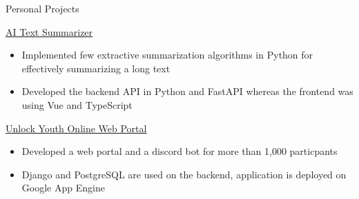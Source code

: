 \documentclass{article}
\newlength{\tabin}
\newlength{\secsep}
\newcommand{\lineunder}{\vspace*{-8pt} \\ \hspace*{-6pt} \hrulefill \\ \vspace*{-15pt}}
\newenvironment{tabbedsection}[1]{
  \begin{list}{}{
      \setlength{\itemsep}{0pt}
      \setlength{\labelsep}{0pt}
      \setlength{\labelwidth}{0pt}
      \setlength{\leftmargin}{\tabin}
      \setlength{\rightmargin}{\tabin}
      \setlength{\listparindent}{0pt}
      \setlength{\parsep}{0pt}
      \setlength{\parskip}{0pt}
      \setlength{\partopsep}{0pt}
      \setlength{\topsep}{#1}
    }
  \item[]
}{\end{list}}
\newenvironment{resume_section}[1]{
  \filbreak
  \vspace{2\secsep}
  \textsc{\large#1}
  \lineunder
  \begin{tabbedsection}{\secsep}
}{\end{tabbedsection}}
\newenvironment{resume_subsection}[2][]{
  \textbf{#2} \hfill {\footnotesize #1} \hspace{2em}
  \begin{tabbedsection}{0.5\secsep}
}{\end{tabbedsection}}
\newenvironment{subitems}{
  \renewcommand{\labelitemi}{-}
  \begin{itemize}
      \setlength{\labelsep}{1em}
}{\end{itemize}}
\begin{document}
\begin{resume_section}{Personal Projects}

  \begin{resume_subsection}{\href{https://github.com/marcustut/summarize}{AI Text Summarizer}}
    \begin{subitems}
      \item Implemented few extractive summarization algorithms in Python for effectively summarizing a long text
      \item Developed the backend API in Python and FastAPI whereas the frontend was using Vue and TypeScript
    \end{subitems}
  \end{resume_subsection}


  \begin{resume_subsection}{\href{https://github.com/marcustut/UnlockProject}{Unlock Youth Online Web Portal}}
    \begin{subitems}
      \item Developed a web portal and a discord bot for more than 1,000 particpants
      \item Django and PostgreSQL are used on the backend, application is deployed on Google App Engine
    \end{subitems}
  \end{resume_subsection}
\end{resume_section}
\end{document}

